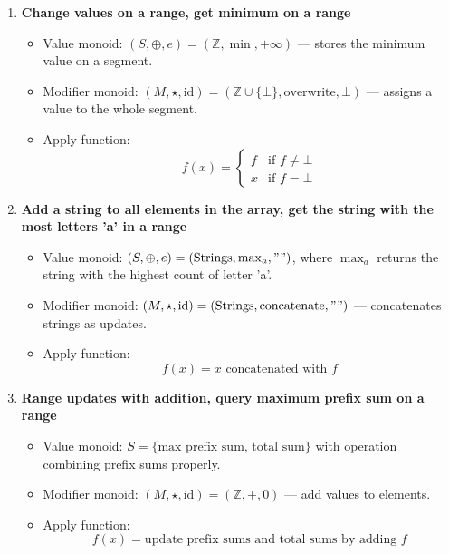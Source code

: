 \documentclass[11pt]{article}
\begin{document}
\begin{enumerate}
    \item \textbf{Change values on a range, get minimum on a range} \\
    \begin{itemize}
        \item Value monoid: \( (S, \oplus, e) = (\mathbb{Z}, \min, +\infty) \) — stores the minimum value on a segment.
        \item Modifier monoid: \( (M, \star, \mathrm{id}) = (\mathbb{Z} \cup \{\bot\}, \text{overwrite}, \bot) \) — assigns a value to the whole segment.
        \item Apply function: 
        \[
            f(x) = \begin{cases}
            f & \text{if } f \neq \bot \\
            x & \text{if } f = \bot
            \end{cases}
        \]
    \end{itemize}

    \item \textbf{Add a string to all elements in the array, get the string with the most letters 'a' in a range} \\
    \begin{itemize}
        \item Value monoid: \( (S, \oplus, e) = (\text{Strings}, \max_a, "") \), where \(\max_a\) returns the string with the highest count of letter 'a'.
        \item Modifier monoid: \( (M, \star, \mathrm{id}) = (\text{Strings}, \text{concatenate}, "") \) — concatenates strings as updates.
        \item Apply function: 
        \[
            f(x) = x \text{ concatenated with } f
        \]
    \end{itemize}

    \item \textbf{Range updates with addition, query maximum prefix sum on a range} \\
    \begin{itemize}
        \item Value monoid: \( S = \{ \text{max prefix sum, total sum} \} \) with operation combining prefix sums properly.
        \item Modifier monoid: \( (M, \star, \mathrm{id}) = (\mathbb{Z}, +, 0) \) — add values to elements.
        \item Apply function: 
        \[
            f(x) = \text{update prefix sums and total sums by adding } f
        \]
    \end{itemize}
\end{enumerate}
\end{document}
